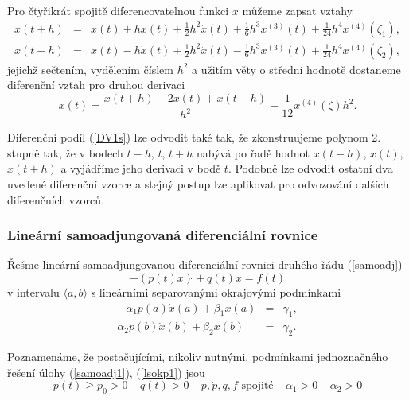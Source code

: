 \documentclass[a4paper, 12pt]{book}
\theoremstyle{definition}
\begin{document}
Pro čtyřikrát spojitě diferencovatelnou funkci $x$ můžeme zapsat 
vztahy
\begin{eqnarray*}
x(t+h)&=&x(t)+h\dot x(t)+\frac 12h^2 \ddot x(t)+\frac 16h^3x^{(3)}(t)+\frac 1{24}h^4x^{(4)}(\zeta_1),\\
x(t-h)&=&x(t)-h\dot x(t)+\frac 12h^2 \ddot x(t)-\frac 16h^3x^{(3)}(t)+\frac 1{24}h^4x^{(4)}(\zeta_2),
\end{eqnarray*}
jejichž sečtením, vydělením číslem $h^2$ a užitím věty o střední hodnotě 
dostaneme diferenční vztah pro druhou derivaci
\begin{equation}\label{DV2}
\ddot x(t)=\frac{x(t+h)-2x(t)+x(t-h)}{h^2} - \frac 1{12}x^{(4)}(\zeta)h^2.
\end{equation}

Diferenční podíl (\ref{DV1s}) lze odvodit také tak, že zkonstruujeme polynom 
2. stupně tak, že v bodech $t-h$, $t$, $t+h$ nabývá po řadě hodnot $x(t-h)$, $x(t)$, 
$x(t+h)$ a vyjádříme jeho derivaci v bodě $t$. Podobně lze odvodit ostatní dva 
uvedené diferenční vzorce a stejný postup lze aplikovat pro odvozování dalších 
diferenčních vzorců.

\subsubsection{Lineární samoadjungovaná diferenciální rovnice}
Řešme lineární samoadjungovanou diferenciální rovnici druhého řádu 
(\ref{samoadj})
\begin{equation}\label{samoadj1}
-(p(t)\dot x)\dot{}+q(t)x=f(t)
\end{equation}
v intervalu $\langle a,b\rangle$
s lineárními separovanými okrajovými podmínkami
\begin{equation}\label{lsokp1}
\begin{array}{rcl}
-\alpha_1 p(a) \dot x(a) + \beta_1 x(a)&=&\gamma_1,\\
\alpha_2 p(b) \dot x(b) + \beta_2 x(b)&=&\gamma_2.
\end{array}
\end{equation}

Poznamenáme, že postačujícími, nikoliv nutnými, podmínkami jednoznačného řešení 
úlohy (\ref{samoadj1}), (\ref{lsokp1}) jsou
\begin{displaymath}
 p(t) \geq p_0 > 0~~~~~q(t) > 0~~~~~p,\dot p,q,f \mbox{~spojité}~~~~~\alpha_1 >0~~~~~\alpha_2 >0
\end{displaymath}
\end{document}
